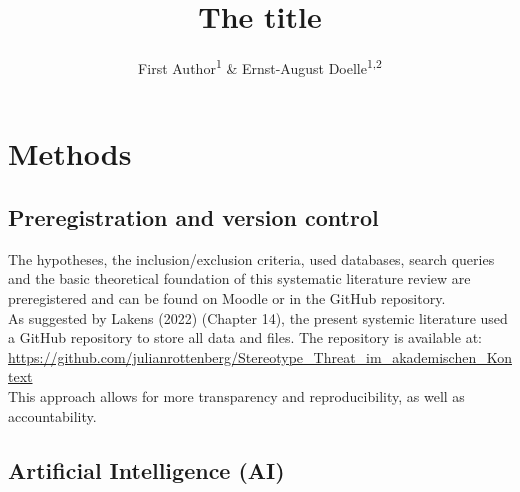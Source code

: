 \documentclass[
  stu,floatsintext]{apa7}
\title{The title}
\author{First Author\textsuperscript{1} \& Ernst-August Doelle\textsuperscript{1,2}}
\date{}
\affiliation{\vspace{0.5cm}\textsuperscript{1} Wilhelm-Wundt-University\\\textsuperscript{2} Konstanz Business School}
\begin{document}
\maketitle

\section{Methods}\label{methods}

\subsection{Preregistration and version control}\label{preregistration-and-version-control}

The hypotheses, the inclusion/exclusion criteria, used databases, search queries and the basic theoretical foundation of this systematic literature review are preregistered and can be found on Moodle or in the GitHub repository.\\
As suggested by Lakens (2022) (Chapter 14), the present systemic literature used a GitHub repository to store all data and files. The repository is available at: \url{https://github.com/julianrottenberg/Stereotype_Threat_im_akademischen_Kontext}\\
This approach allows for more transparency and reproducibility, as well as accountability.

\subsection{Artificial Intelligence (AI)}\label{artificial-intelligence-ai}
\end{document}

